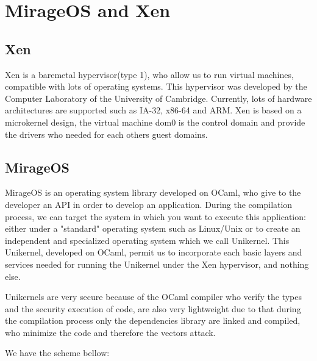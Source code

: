\documentclass[10pt,a4paper]{report}
\begin{document}
\chapter{MirageOS and Xen}
\section{Xen}
Xen is a baremetal hypervisor(type 1), who allow us to run virtual machines, compatible with lots of operating systems. This hypervisor was developed by the Computer Laboratory of the University of Cambridge. Currently, lots of hardware architectures are supported such as IA-32, x86-64 and ARM.
Xen is based on a microkernel design, the virtual machine dom0 is the control domain and provide the drivers who needed for each others guest domains.\newline
\section{MirageOS}
MirageOS is an operating system library developed on OCaml, who give to the developer an API in order to develop an application. 
During the compilation process, we can target the system in which you want to execute this application: either under a "standard" operating system such as Linux/Unix or to create an independent and specialized operating system which we call Unikernel. 
This Unikernel, developed on OCaml, permit us to incorporate each basic layers and services needed for running the Unikernel under the Xen hypervisor, and nothing else. \newpage

Unikernels are very secure because of the OCaml compiler who verify the types and the security execution of code, are also very lightweight due to that during the compilation process only the dependencies library are linked and compiled, who minimize the code and therefore the vectors attack.\newline

We have the scheme bellow:  \newline  \newline
\end{document}
